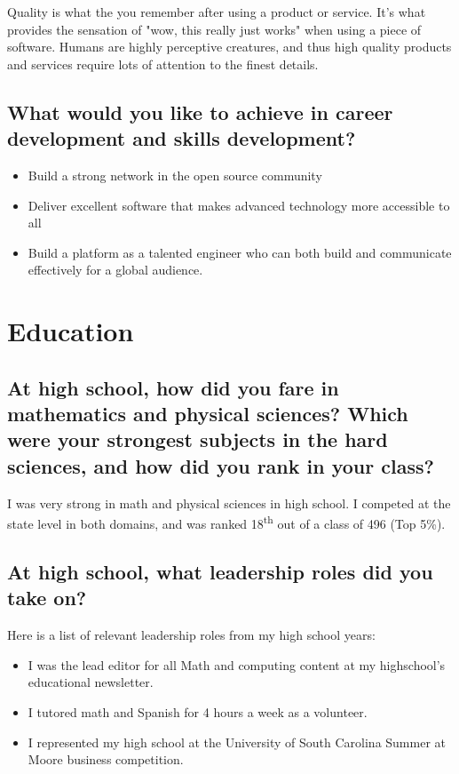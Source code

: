 \documentclass{article}
\begin{document}
Quality is what the you remember after using a product or service. It's what
provides the sensation of "wow, this really just works" when using a piece of
software. Humans are highly perceptive creatures, and thus high
quality products and services require lots of attention to the finest details.


\subsection{What would you like to achieve in career development and skills
  development?}

\begin{itemize}
  \item Build a strong network in the open source community
  \item Deliver excellent software that makes advanced technology more accessible to all
  \item Build a platform as a talented engineer who can both build and communicate effectively for a global audience.
\end{itemize}

\section{Education}
\subsection{At high school, how did you fare in mathematics
  and physical sciences? Which were your strongest subjects in the hard sciences,
  and how did you rank in your class?}

I was very strong in math and physical sciences in high school. I competed at the state level
in both domains, and was ranked 18\textsuperscript{th} out of a class of 496 (Top 5\%).

\subsection{At high school, what leadership roles did you take on?}

Here is a list of relevant leadership roles from my high school years:
\begin{itemize}
  \item I was the lead editor for all Math and computing content at my highschool's educational newsletter.
  \item I tutored math and Spanish for 4 hours a week as a volunteer.
  \item I represented my high school at the University of South Carolina Summer at Moore business competition.
\end{itemize}
\end{document}
